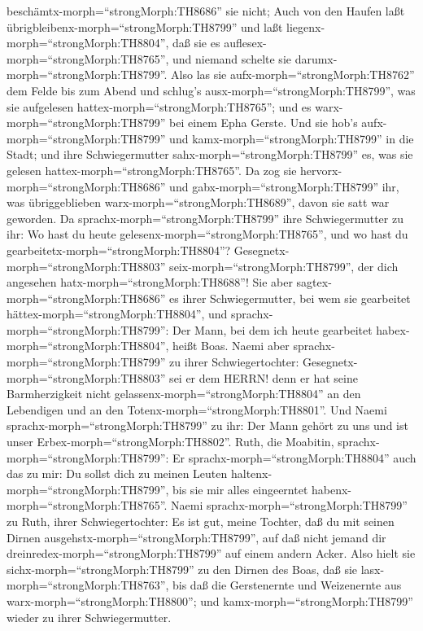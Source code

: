 beschämtx-morph=``strongMorph:TH8686'' sie nicht;  Auch von
den Haufen laßt übrigbleibenx-morph=``strongMorph:TH8799'' und laßt
liegenx-morph=``strongMorph:TH8804'', daß sie es
auflesex-morph=``strongMorph:TH8765'', und niemand schelte sie
darumx-morph=``strongMorph:TH8799''.  Also las sie
aufx-morph=``strongMorph:TH8762'' dem Felde bis zum Abend und schlug's
ausx-morph=``strongMorph:TH8799'', was sie aufgelesen
hattex-morph=``strongMorph:TH8765''; und es
warx-morph=``strongMorph:TH8799'' bei einem Epha Gerste. 
Und sie hob's aufx-morph=``strongMorph:TH8799'' und
kamx-morph=``strongMorph:TH8799'' in die Stadt; und ihre Schwiegermutter
sahx-morph=``strongMorph:TH8799'' es, was sie gelesen
hattex-morph=``strongMorph:TH8765''. Da zog sie
hervorx-morph=``strongMorph:TH8686'' und
gabx-morph=``strongMorph:TH8799'' ihr, was übriggeblieben
warx-morph=``strongMorph:TH8689'', davon sie satt war geworden.
 Da sprachx-morph=``strongMorph:TH8799'' ihre
Schwiegermutter zu ihr: Wo hast du heute
gelesenx-morph=``strongMorph:TH8765'', und wo hast du
gearbeitetx-morph=``strongMorph:TH8804''?
Gesegnetx-morph=``strongMorph:TH8803''
seix-morph=``strongMorph:TH8799'', der dich angesehen
hatx-morph=``strongMorph:TH8688''! Sie aber
sagtex-morph=``strongMorph:TH8686'' es ihrer Schwiegermutter, bei wem
sie gearbeitet hättex-morph=``strongMorph:TH8804'', und
sprachx-morph=``strongMorph:TH8799'': Der Mann, bei dem ich heute
gearbeitet habex-morph=``strongMorph:TH8804'', heißt Boas. 
Naemi aber sprachx-morph=``strongMorph:TH8799'' zu ihrer
Schwiegertochter: Gesegnetx-morph=``strongMorph:TH8803'' sei er dem
HERRN! denn er hat seine Barmherzigkeit nicht
gelassenx-morph=``strongMorph:TH8804'' an den Lebendigen und an den
Totenx-morph=``strongMorph:TH8801''. Und Naemi
sprachx-morph=``strongMorph:TH8799'' zu ihr: Der Mann gehört zu uns und
ist unser Erbex-morph=``strongMorph:TH8802''.  Ruth, die
Moabitin, sprachx-morph=``strongMorph:TH8799'': Er
sprachx-morph=``strongMorph:TH8804'' auch das zu mir: Du sollst dich zu
meinen Leuten haltenx-morph=``strongMorph:TH8799'', bis sie mir alles
eingeerntet habenx-morph=``strongMorph:TH8765''.  Naemi
sprachx-morph=``strongMorph:TH8799'' zu Ruth, ihrer Schwiegertochter: Es
ist gut, meine Tochter, daß du mit seinen Dirnen
ausgehstx-morph=``strongMorph:TH8799'', auf daß nicht jemand dir
dreinredex-morph=``strongMorph:TH8799'' auf einem andern Acker.
 Also hielt sie sichx-morph=``strongMorph:TH8799'' zu den
Dirnen des Boas, daß sie lasx-morph=``strongMorph:TH8763'', bis daß die
Gerstenernte und Weizenernte aus warx-morph=``strongMorph:TH8800''; und
kamx-morph=``strongMorph:TH8799'' wieder zu ihrer Schwiegermutter.

